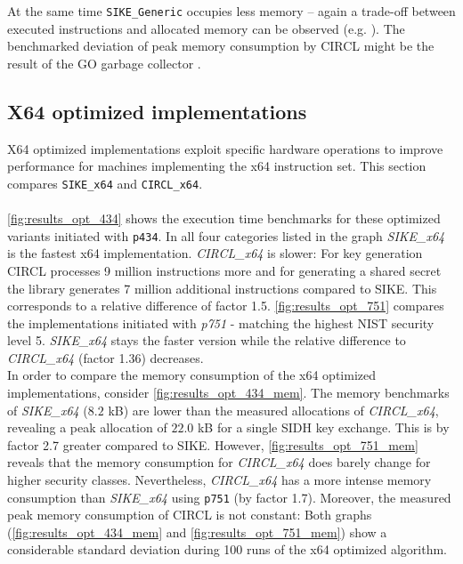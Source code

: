 At the same time \texttt{SIKE\_Generic} occupies less memory -- again a trade-off between executed instructions and allocated memory can be observed (e.g. \parencite{1056220}). The benchmarked deviation of peak memory consumption by \gls{CIRCL} might be the result of the GO garbage collector \parencite{Hudson:GGC}.

\subsection{X64 optimized implementations}
\label{sec:sike_circl_analysis_x64}
X64 optimized implementations exploit specific hardware operations to improve performance for machines implementing the x64 instruction set. This section compares \texttt{SIKE\_x64} and \texttt{CIRCL\_x64}.
\\\\
\autoref{fig:results_opt_434} shows the execution time benchmarks for these optimized variants initiated with \texttt{p434}. In all four categories listed in the graph \textit{SIKE\_x64}  is the fastest x64 implementation. \textit{CIRCL\_x64} is slower: For key generation \gls{CIRCL} processes 9 million instructions more and for generating a shared secret the library generates 7 million additional instructions compared to \gls{SIKE}. This corresponds to a relative difference of factor 1.5.
\autoref{fig:results_opt_751} compares the implementations initiated with \textit{p751} - matching the highest \gls{NIST} security level 5. \textit{SIKE\_x64} stays the faster version while the relative difference to \textit{CIRCL\_x64} (factor 1.36) decreases.
\\
In order to compare the memory consumption of the x64 optimized implementations, consider \autoref{fig:results_opt_434_mem}. The memory benchmarks of \textit{SIKE\_x64} ($8.2$ \gls{kB}) are  lower than the measured allocations of \textit{\gls{CIRCL}\_x64}, revealing  a peak allocation of $22.0$ \gls{kB} for a single \gls{SIDH} key exchange. This is by factor 2.7 greater compared to \gls{SIKE}. However, \autoref{fig:results_opt_751_mem} reveals that the memory consumption for \textit{\gls{CIRCL}\_x64} does barely change for higher security classes. Nevertheless,  \textit{\gls{CIRCL}\_x64} has a more intense memory consumption than \textit{SIKE\_x64} using \texttt{p751} (by factor 1.7). Moreover, the measured peak memory consumption of \gls{CIRCL} is not constant: Both graphs (\ref{fig:results_opt_434_mem} and \ref{fig:results_opt_751_mem}) show a considerable standard deviation during 100 runs of the x64 optimized algorithm.
